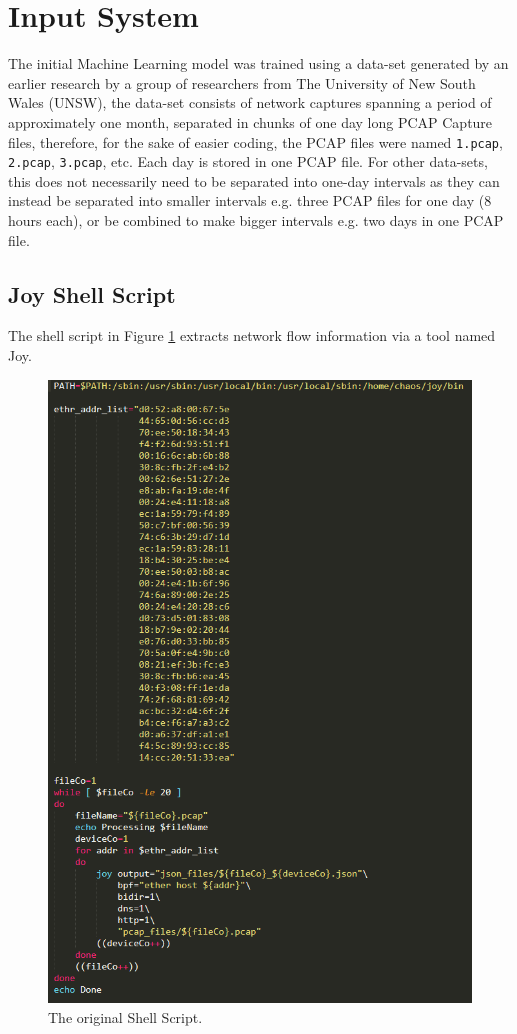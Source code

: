 \documentclass{article}
\begin{document}
\pagebreak

\section{Input System}
The initial Machine Learning model was trained using a data-set generated
by an earlier research by a group of researchers from The University of
New South Wales (UNSW), the data-set consists of network captures
spanning a period of approximately one month, separated in chunks of one
day long PCAP Capture files, therefore, for the sake of easier coding,
the PCAP files were named \texttt{1.pcap}, \texttt{2.pcap}, \texttt{3.pcap}, etc. Each
day is stored in one PCAP file. For other data-sets, this does not
necessarily need to be separated into one-day intervals as they can
instead be separated into smaller intervals e.g. three PCAP files for
one day (8 hours each), or be combined to make bigger intervals e.g. two
days in one PCAP file.

\subsection{Joy Shell Script}
The shell script in Figure \ref{fig:shell} extracts network flow information via a tool named Joy.\pagebreak

\begin{figure}[!ht]
    \centering
    \includegraphics[width=12cm]{InputSystem/Shell.png}
    \caption{The original Shell Script.} 
    \label{fig:shell}
\end{figure}
\pagebreak
\end{document}
